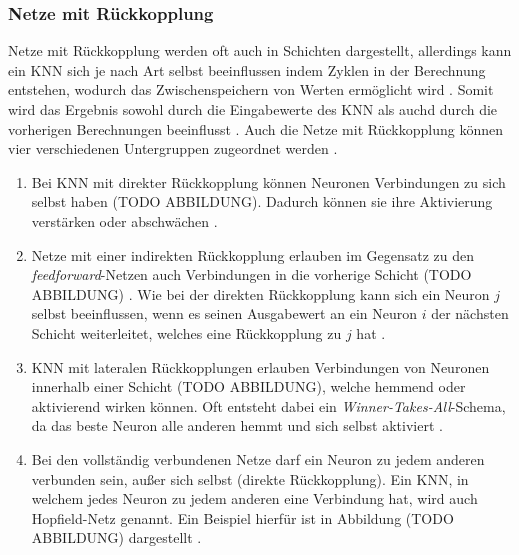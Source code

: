 \subsubsection{Netze mit Rückkopplung}
Netze mit Rückkopplung werden oft auch in Schichten dargestellt, allerdings kann ein \ac{KNN} sich je nach Art selbst beeinflussen indem Zyklen in der Berechnung entstehen, wodurch das Zwischenspeichern von Werten ermöglicht wird \cite{zell2003simulation}. Somit wird das Ergebnis sowohl durch die Eingabewerte des \ac{KNN} als auchd durch die vorherigen Berechnungen beeinflusst \cite{lin1998embedded}. Auch die Netze mit Rückkopplung können vier verschiedenen Untergruppen zugeordnet werden \cite{zell2003simulation}.\\
\begin{enumerate} %
	\item Bei \ac{KNN} mit direkter Rückkopplung können Neuronen Verbindungen zu sich selbst haben (TODO ABBILDUNG). Dadurch können sie ihre Aktivierung verstärken oder abschwächen \cite{zell2003simulation}.
	\item Netze mit einer indirekten Rückkopplung erlauben im Gegensatz zu den \emph{feedforward}-Netzen auch Verbindungen in die vorherige Schicht (TODO ABBILDUNG) \cite{zell2003simulation}. Wie bei der direkten Rückkopplung kann sich ein Neuron $j$ selbst beeinflussen, wenn es seinen Ausgabewert an ein Neuron $i$ der nächsten Schicht weiterleitet, welches eine Rückkopplung zu $j$ hat \cite{kriesel2008kleiner}.
	\item \ac{KNN} mit lateralen Rückkopplungen erlauben Verbindungen von Neuronen innerhalb einer Schicht (TODO ABBILDUNG), welche hemmend oder aktivierend wirken können. Oft entsteht dabei ein \emph{Winner-Takes-All}-Schema, da das beste Neuron alle anderen hemmt und sich selbst aktiviert \cite{kriesel2008kleiner}.
	\item Bei den vollständig verbundenen Netze darf ein Neuron zu jedem anderen verbunden sein, außer sich selbst (direkte Rückkopplung). Ein \ac{KNN}, in welchem jedes Neuron zu jedem anderen eine Verbindung hat, wird auch Hopfield-Netz genannt. Ein Beispiel hierfür ist in Abbildung (TODO ABBILDUNG) dargestellt \cite{kriesel2008kleiner}.  
\end{enumerate}

